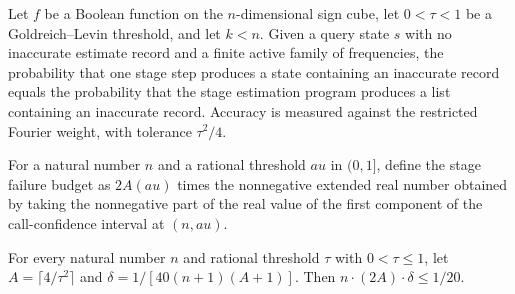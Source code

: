 \begin{theorem}
\label{FABL.outerEventProbability_goldreichLevinStageStepProgram_failure}
\leanok
{}
Let $f$ be a Boolean function on the $n$-dimensional sign cube, let $0<\tau<1$ be a
Goldreich–Levin threshold, and let $k<n$. Given a query state $s$ with no inaccurate
estimate record and a finite active family of frequencies, the probability that one
stage step produces a state containing an inaccurate record equals the probability that
the stage estimation program produces a list containing an inaccurate record. Accuracy
is measured against the restricted Fourier weight, with tolerance $\tau^2/4$.
\end{theorem}

\begin{definition}
\label{FABL.goldreichLevinStageFailureBudget}
\leanok
{}
For a natural number $n$ and a rational threshold $	au$ in $(0,1]$, define the stage
failure budget as $2A(	au)$ times the nonnegative extended real number obtained by
taking the nonnegative part of the real value of the first component of the
call-confidence interval at $(n,	au)$.
\end{definition}

\begin{theorem}
\label{FABL.goldreichLevinFailureBudget_rat_le_one_twentieth}
\leanok
{}
For every natural number $n$ and rational threshold $\tau$ with $0<\tau\le 1$, let
$A=\lceil4/\tau^2\rceil$ and $\delta=1/[40(n+1)(A+1)]$. Then $n\cdot(2A)\cdot\delta\le
1/20$.
\end{theorem}

